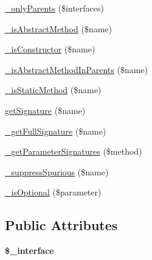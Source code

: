 \begin{DoxyCompactItemize}
\hyperlink{class_simple_reflection_ab619efb054cde5a01c7db7dece7884fa}{\_\-onlyParents} (\$interfaces)
\item 
\hyperlink{class_simple_reflection_a1fe2493b64709f4a14be03cd7726e07f}{\_\-isAbstractMethod} (\$name)
\item 
\hyperlink{class_simple_reflection_a338c5377bd72a61a5664f3e7cf73514c}{\_\-isConstructor} (\$name)
\item 
\hyperlink{class_simple_reflection_ac9006131842cb26ec294640918828191}{\_\-isAbstractMethodInParents} (\$name)
\item 
\hyperlink{class_simple_reflection_a87c6f5b63b2eecc642580e32660417ae}{\_\-isStaticMethod} (\$name)
\item 
\hyperlink{class_simple_reflection_a6145a1e4b2502359151d62f044b86f25}{getSignature} (\$name)
\item 
\hyperlink{class_simple_reflection_ab1cf79a333f164b0ddba43126b3f1c55}{\_\-getFullSignature} (\$name)
\item 
\hyperlink{class_simple_reflection_a491066d77b32606cfdb27a6afc8718f3}{\_\-getParameterSignatures} (\$method)
\item 
\hyperlink{class_simple_reflection_affdabe4bf112c447fbe6e1c9bae38ac3}{\_\-suppressSpurious} (\$name)
\item 
\hyperlink{class_simple_reflection_a819a499d68a179ddb1edcc0ecbfec02e}{\_\-isOptional} (\$parameter)
\end{DoxyCompactItemize}
\subsection*{Public Attributes}
\begin{DoxyCompactItemize}
\item 
\hypertarget{class_simple_reflection_a4f9fa8bfa4248a82c7a1cfd9c1b78f58}{
{\bfseries \$\_\-interface}}
\label{class_simple_reflection_a4f9fa8bfa4248a82c7a1cfd9c1b78f58}

\end{DoxyCompactItemize}



